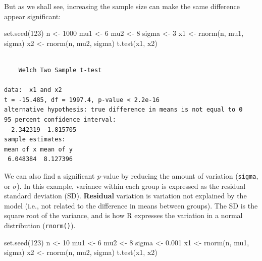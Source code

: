 \documentclass[
  13,
  letterpaper,
]{report}
\newenvironment{Shaded}{\begin{snugshade}}{\end{snugshade}}
\newcommand{\DecValTok}[1]{\textcolor[rgb]{0.68,0.00,0.00}{#1}}
\newcommand{\FloatTok}[1]{\textcolor[rgb]{0.68,0.00,0.00}{#1}}
\newcommand{\FunctionTok}[1]{\textcolor[rgb]{0.28,0.35,0.67}{#1}}
\newcommand{\NormalTok}[1]{\textcolor[rgb]{0.00,0.23,0.31}{#1}}
\newcommand{\OtherTok}[1]{\textcolor[rgb]{0.00,0.23,0.31}{#1}}
\begin{document}
But as we shall see, increasing the sample size can make the same
difference appear significant:

\begin{Shaded}
\begin{Highlighting}[]
\FunctionTok{set.seed}\NormalTok{(}\DecValTok{123}\NormalTok{)}
\NormalTok{n }\OtherTok{\textless{}{-}} \DecValTok{1000}
\NormalTok{mu1 }\OtherTok{\textless{}{-}} \DecValTok{6}
\NormalTok{mu2 }\OtherTok{\textless{}{-}} \DecValTok{8}
\NormalTok{sigma }\OtherTok{\textless{}{-}} \DecValTok{3}
\NormalTok{x1 }\OtherTok{\textless{}{-}} \FunctionTok{rnorm}\NormalTok{(n, mu1, sigma)}
\NormalTok{x2 }\OtherTok{\textless{}{-}} \FunctionTok{rnorm}\NormalTok{(n, mu2, sigma)}
\FunctionTok{t.test}\NormalTok{(x1, x2)}
\end{Highlighting}
\end{Shaded}

\begin{verbatim}

    Welch Two Sample t-test

data:  x1 and x2
t = -15.485, df = 1997.4, p-value < 2.2e-16
alternative hypothesis: true difference in means is not equal to 0
95 percent confidence interval:
 -2.342319 -1.815705
sample estimates:
mean of x mean of y 
 6.048384  8.127396 
\end{verbatim}

We can also find a significant \emph{p}-value by reducing the amount of
variation (\texttt{sigma}, or \(\sigma\)). In this example, variance
within each group is expressed as the residual standard deviation (SD).
\textbf{Residual} variation is variation not explained by the model
(i.e., not related to the difference in means between groups). The SD is
the square root of the variance, and is how R expresses the variation in
a normal distribution (\texttt{rnorm()}).

\begin{Shaded}
\begin{Highlighting}[]
\FunctionTok{set.seed}\NormalTok{(}\DecValTok{123}\NormalTok{)}
\NormalTok{n }\OtherTok{\textless{}{-}} \DecValTok{10}
\NormalTok{mu1 }\OtherTok{\textless{}{-}} \DecValTok{6}
\NormalTok{mu2 }\OtherTok{\textless{}{-}} \DecValTok{8}
\NormalTok{sigma }\OtherTok{\textless{}{-}} \FloatTok{0.001}
\NormalTok{x1 }\OtherTok{\textless{}{-}} \FunctionTok{rnorm}\NormalTok{(n, mu1, sigma)}
\NormalTok{x2 }\OtherTok{\textless{}{-}} \FunctionTok{rnorm}\NormalTok{(n, mu2, sigma)}
\FunctionTok{t.test}\NormalTok{(x1, x2)}
\end{Highlighting}
\end{Shaded}
\end{document}
